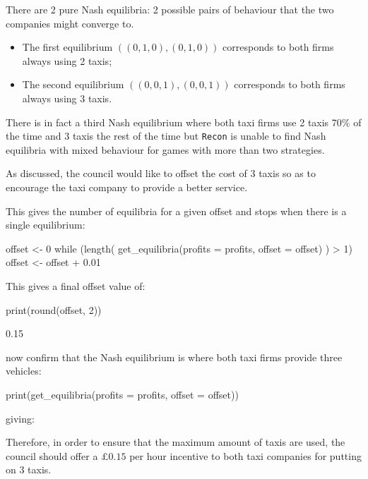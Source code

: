 There are 2 pure Nash equilibria: 2 possible pairs of behaviour that the two
companies might converge to.

\begin{itemize}
    \item The first equilibrium \(((0, 1, 0), (0, 1, 0))\) corresponds to both
          firms always using 2 taxis;
    \item The second equilibrium \(((0, 0, 1), (0, 0, 1))\) corresponds to both
          firms always using 3 taxis.
\end{itemize}

There is in fact a third Nash equilibrium where both taxi firms use 2 taxis 70\%
of the time and 3 taxis the rest of the time but \texttt{Recon} is unable
to find Nash equilibria with mixed behaviour for games with more than two
strategies.

As discussed, the council would like to offset the cost of 3
taxis so as to encourage the taxi company to provide a better service.

This gives the number of equilibria for a given offset and stops when there is a
single equilibrium:

\begin{Rin}
offset <- 0
while (length(
  get_equilibria(profits = profits, offset = offset)
  ) > 1){
  offset <- offset + 0.01
}
\end{Rin}

This gives a final offset value of:

\begin{Rin}
print(round(offset, 2))
\end{Rin}

\begin{Rout}
[1] 0.15
\end{Rout}

now confirm that the Nash equilibrium is where both taxi firms provide
three vehicles:

\begin{Rin}
print(get_equilibria(profits = profits, offset = offset))
\end{Rin}

giving:


Therefore, in order to ensure that the maximum amount of taxis are used, the
council should offer a \(\pounds 0.15\) per hour incentive to both taxi
companies for putting on 3 taxis.

